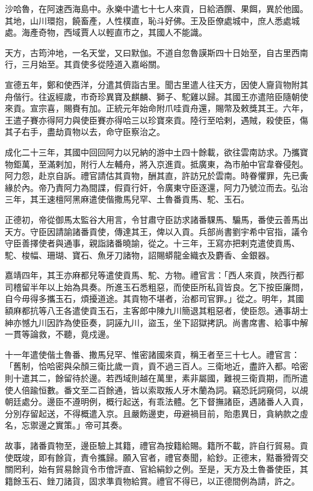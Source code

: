 \begin{pinyinscope}
沙哈魯，在阿速西海島中。永樂中遣七十七人來貢，日給酒饌、果餌，異於他國。其地，山川環抱，饒畜產，人性樸直，恥斗好佛。王及臣僚處城中，庶人悉處城處。海產奇物，西域賈人以輕直市之，其國人不能識。

天方，古筠沖地，一名天堂，又曰默伽。不道自忽魯謨斯四十日始至，自古里西南行，三月始至。其貢使多從陸道入嘉峪關。

宣德五年，鄭和使西洋，分遣其儕詣古里。聞古里遣人往天方，因使人齎貨物附其舟偕行。往返經歲，市奇珍異寶及麒麟、獅子、駝雞以歸。其國王亦遣陪臣隨朝使來貢。宣宗喜，賜賚有加。正統元年始命附爪哇貢舟還，賜幣及敕獎其王。六年，王遣子賽亦得阿力與使臣賽亦得哈三以珍寶來貢。陸行至哈剌，遇賊，殺使臣，傷其子右手，盡劫貢物以去，命守臣察治之。

成化二十三年，其國中回回阿力以兄納的游中土四十餘載，欲往雲南訪求。乃攜寶物鉅萬，至滿剌加，附行人左輔舟，將入京進貢。抵廣東，為市舶中官韋眷侵剋。阿力怨，赴京自訴。禮官請估其貢物，酬其直，許訪兄於雲南。時眷懼罪，先已夤緣於內。帝乃責阿力為間諜，假貢行奸，令廣東守臣逐還，阿力乃號泣而去。弘治三年，其王速檀阿黑麻遣使偕撒馬兒罕、土魯番貢馬、駝、玉石。

正德初，帝從御馬太監谷大用言，令甘肅守臣訪求諸番騍馬、騸馬，番使云善馬出天方。守臣因請諭諸番貢使，傳達其王，俾以入貢。兵部尚書劉宇希中官指，議令守臣善擇使者與通事，親詣諸番曉諭，從之。十三年，王寫亦把剌克遣使貢馬、駝、梭幅、珊瑚、寶石、魚牙刀諸物，詔賜蟒龍金織衣及麝香、金銀器。

嘉靖四年，其王亦麻都兒等遣使貢馬、駝、方物。禮官言：「西人來貢，陜西行都司稽留半年以上始為具奏。所進玉石悉粗惡，而使臣所私貨皆良。乞下按臣廉問，自今毋得多攜玉石，煩擾道途。其貢物不堪者，治都司官罪。」從之。明年，其國額麻都抗等八王各遣使貢玉石，主客郎中陳九川簡退其粗惡者，使臣怨。通事胡士紳亦憾九川因詐為使臣奏，詞誣九川，盜玉，坐下詔獄拷訊。尚書席書、給事中解一貫等論救，不聽，竟戍邊。

十一年遣使偕土魯番、撒馬兒罕、惟密諸國來貢，稱王者至三十七人。禮官言：「舊制，恰哈密與朵顏三衛比歲一貢，貢不過三百人。三衛地近，盡許入都。哈密則十遣其二，餘留待於邊。若西域則越在萬里，素非屬國，難視三衛貢期，而所遣使人倍踰恒數。番文至二百餘通，皆以索取叛人牙木蘭為詞。竊恐託詞窺伺，以覘朝廷處分。邊臣不遵明例，概行起送，有乖法體。乞下督撫諸臣，遇諸番人入貢，分別存留起送，不得概遣入京。且嚴飭邊吏，毋避禍目前，貽患異日，貪納款之虛名，忘禦邊之實策。」帝可其奏。

故事，諸番貢物至，邊臣驗上其籍，禮官為按籍給賜。籍所不載，許自行貿易。貢使既竣，即有餘貨，責令攜歸。願入官者，禮官奏聞，給鈔。正德末，黠番猾胥交關罔利，始有貿易餘貨令市儈評直、官給絹鈔之例。至是，天方及土魯番使臣，其籍餘玉石、銼刀諸貨，固求準貢物給賞。禮官不得已，以正德間例為請，許之。


\end{pinyinscope}
